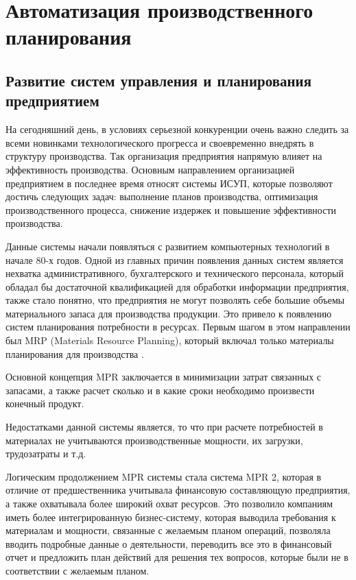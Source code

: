 \chapter{Автоматизация производственного планирования}
\section{Развитие систем управления и планирования предприятием}
На сегодняшний день, в условиях серьезной конкуренции очень важно следить за всеми новинками технологического прогресса и своевременно внедрять в структуру производства.
Так организация предприятия напрямую влияет на эффективность производства. Основным направлением организацией предприятием в последнее время относят системы ИСУП, которые позволяют достичь следующих задач: выполнение планов производства, оптимизация производственного процесса, снижение издержек и повышение эффективности производства.

Данные системы начали появляться с развитием компьютерных технологий в начале 80-х годов. Одной из главных причин появления данных систем является нехватка административного, бухгалтерского и технического персонала, который обладал бы достаточной квалификацией для обработки информации предприятия, также стало понятно, что предприятия не могут позволять себе большие объемы материального запаса для производства продукции. Это привело к появлению систем планирования потребности в ресурсах. Первым шагом в этом направлении был MRP (Materials Resource Planning), который включал только материалы планирования для производства \cite{MRP}.

Основной концепция MPR заключается в минимизации затрат связанных с запасами, а также расчет сколько и в какие сроки необходимо произвести конечный продукт. 

Недостатками данной системы является, то что при расчете потребностей в материалах не учитываются производственные мощности, их загрузки, трудозатраты и т.д. 

Логическим продолжением MPR системы стала система MPR 2, которая в отличие от предшественника учитывала финансовую составляющую предприятия, а также охватывала более широкий охват ресурсов. Это позволило компаниям иметь более интегрированную бизнес-систему, которая выводила требования к материалам и мощности, связанные с желаемым планом операций, позволяла вводить подробные данные о деятельности, переводить все это в финансовый отчет и предложить план действий для решения тех вопросов, которые были не в соответствии с желаемым планом.

